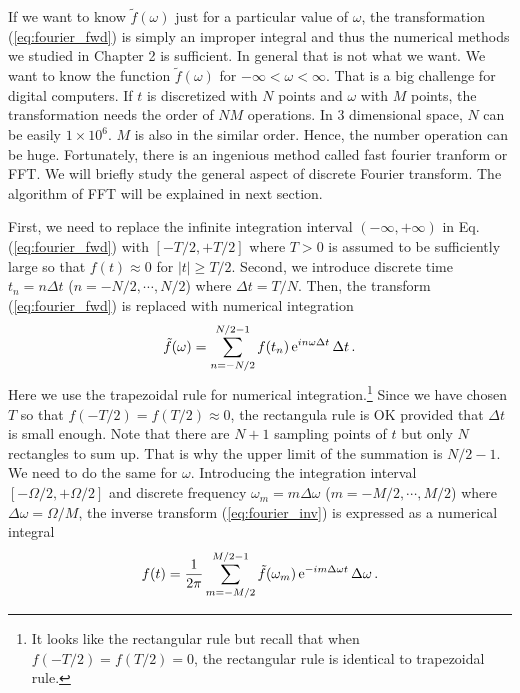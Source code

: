 If we want to know $\tilde{f}(\omega)$ just for a particular value of $\omega$, the transformation (\ref{eq:fourier_fwd}) is simply an improper integral and thus the numerical methods we studied in Chapter 2 is sufficient.  In general that is not what we want.  We want to know the function $\tilde{f}(\omega)$ for $-\infty < \omega <\infty$. That is a big challenge for digital computers.  If  $t$ is discretized with $N$ points and $\omega$ with $M$ points, the transformation needs the order of $N M$ operations.  In 3 dimensional space, $N$ can be easily $1 \times 10^{6}$.  $M$ is also in the similar order.  Hence, the number operation can be huge.  Fortunately, there is an ingenious method called fast fourier tranform or FFT.  We will briefly study the general aspect of discrete Fourier transform.   The algorithm of FFT will be explained in next section.


First, we need to replace the infinite integration interval $(-\infty, +\infty)$ in Eq. (\ref{eq:fourier_fwd}) with $[-T/2,+T/2]$ where $T>0$ is assumed to be sufficiently large so that $f(t)\approx 0$ for $|t|\ge T/2$.  Second, we introduce discrete time $t_n = n \Delta t$ ($n=-N/2, \cdots, N/2$) where $\Delta t=T/N$.  Then, the transform (\ref{eq:fourier_fwd}) is replaced with  numerical integration
\begin{equation}\label{eq:DFT_fwd}
\tilde{f}(\omega) = \sum_{n=-N/2}^{N/2-1} f(t_n)\, \text{e}^{i n  \omega \Delta t} \, \Delta t\,.
\end{equation}
Here we use the trapezoidal rule for numerical integration.\footnote{It looks like the rectangular rule but recall that when $f(-T/2)=f(T/2)=0$, the rectangular rule is identical to trapezoidal rule.} Since we have chosen $T$ so that $f(-T/2)=f(T/2) \approx 0$, the rectangula rule is OK provided that $\Delta t$ is small enough.  Note that there are $N+1$ sampling points of $t$ but only $N$ rectangles to sum up.  That is why the upper limit of the summation is $N/2-1$.
We need to do the same for $\omega$.  Introducing the integration interval $[-\Omega/2, +\Omega/2]$ and discrete frequency $\omega_m = m \Delta \omega$ ($m=-M/2, \cdots, M/2$) where $\Delta \omega  = \Omega/M$, the inverse transform (\ref{eq:fourier_inv}) is expressed as a numerical integral
\begin{equation}\label{eq:DFT_inv}
f(t) = \frac{1}{2\pi}\sum_{m=-M/2}^{M/2-1} \tilde{f}(\omega_m) \, \text{e}^{-im \Delta \omega t}\, \Delta \omega\,.
\end{equation}

